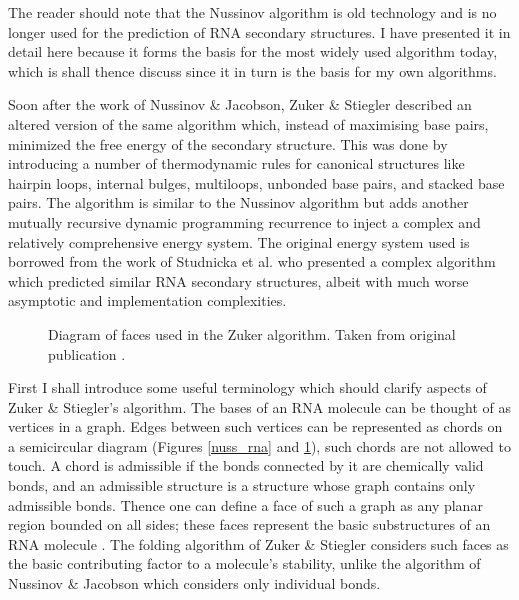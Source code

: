 \documentclass{cshonours}
\begin{document}
The reader should note that the Nussinov algorithm is old technology and is no longer used for the prediction of RNA secondary structures. I have presented it in detail here because it forms the basis for the most widely used algorithm today, which is shall thence discuss since it in turn is the basis for my own algorithms.


Soon after the work of Nussinov \& Jacobson, Zuker \& Stiegler \cite{zuker1981optimal}
described an altered version of the same algorithm which, instead of maximising
base pairs, minimized the free energy of the secondary structure. This was done
by introducing a number of thermodynamic rules for canonical structures like
hairpin loops, internal bulges, multiloops, unbonded base pairs, and stacked base
pairs. The algorithm is similar to the Nussinov algorithm
but adds another mutually recursive dynamic programming recurrence to inject
a complex and relatively comprehensive energy system. The original energy system used is borrowed from the work of Studnicka et al. \cite{studnicka1978computer} who presented a
complex algorithm which predicted similar RNA secondary structures, albeit with
much worse asymptotic and implementation complexities. 


\begin{figure}
\begin{center}
\end{center}
\caption{Diagram of faces used in the Zuker algorithm. Taken from original
publication \cite{zuker1981optimal}.}
\label{zuk_struct}
\end{figure}

First I shall introduce some useful terminology which should clarify aspects of Zuker \& Stiegler’s
algorithm. The bases of an RNA molecule can be thought of as vertices in a
graph. Edges between such vertices can be represented as chords on a semicircular diagram (Figures \ref{nuss_rna} and \ref{zuk_struct}), such chords are not allowed to touch. A chord
is admissible if the bonds connected by it are chemically valid bonds, and an
admissible structure is a structure whose graph contains only admissible bonds.
Thence one can define a face of such a graph as any planar region bounded on all
sides; these faces represent the basic substructures of an RNA molecule \cite{zuker1981optimal}. The
folding algorithm of Zuker \& Stiegler considers such faces as the basic contributing factor to a molecule’s stability, unlike the algorithm of Nussinov \& Jacobson
which considers only individual bonds.
\end{document}
